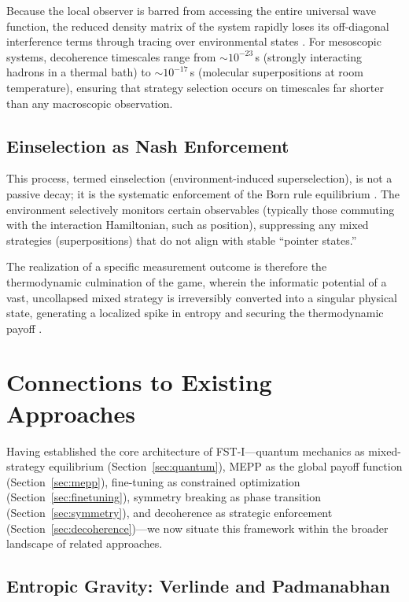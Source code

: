 \documentclass[12pt,a4paper]{article}
\theoremstyle{remark}
\begin{document}
Because the local observer is barred from accessing the entire universal wave function, the reduced density matrix of the system rapidly loses its off-diagonal interference terms through tracing over environmental states \citep{Lindblad1976}. For mesoscopic systems, decoherence timescales range from ${\sim}10^{-23}\,$s (strongly interacting hadrons in a thermal bath) to ${\sim}10^{-17}\,$s (molecular superpositions at room temperature), ensuring that strategy selection occurs on timescales far shorter than any macroscopic observation.

\subsection{Einselection as Nash Enforcement}

This process, termed einselection (environment-induced superselection), is not a passive decay; it is the systematic enforcement of the Born rule equilibrium \citep{Zurek2003}. The environment selectively monitors certain observables (typically those commuting with the interaction Hamiltonian, such as position), suppressing any mixed strategies (superpositions) that do not align with stable ``pointer states.''

The realization of a specific measurement outcome is therefore the thermodynamic culmination of the game, wherein the informatic potential of a vast, uncollapsed mixed strategy is irreversibly converted into a singular physical state, generating a localized spike in entropy and securing the thermodynamic payoff \citep{Lindblad1976}.

\section{Connections to Existing Approaches}
\label{sec:connections}

Having established the core architecture of FST-I---quantum mechanics as mixed-strategy equilibrium (Section~\ref{sec:quantum}), MEPP as the global payoff function (Section~\ref{sec:mepp}), fine-tuning as constrained optimization (Section~\ref{sec:finetuning}), symmetry breaking as phase transition (Section~\ref{sec:symmetry}), and decoherence as strategic enforcement (Section~\ref{sec:decoherence})---we now situate this framework within the broader landscape of related approaches.

\subsection{Entropic Gravity: Verlinde and Padmanabhan}
\end{document}

